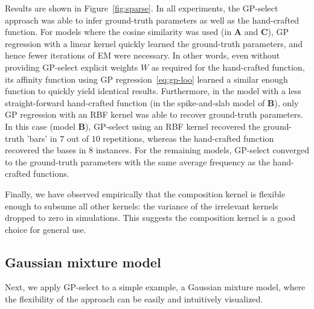 Results are shown in Figure~\ref{fig:sparse}.
In all experiments, the GP-select approach was able to infer ground-truth parameters as well as the hand-crafted function.
For models where the cosine similarity was used (in \textbf{A} and \textbf{C}), GP regression with a linear kernel quickly learned the ground-truth parameters, and hence fewer iterations of EM were necessary.
In other words, even without providing GP-select explicit weights $W$ as required for the hand-crafted function, its affinity function using GP regression~\eqref{eq:gp-loo} learned a similar enough function to quickly yield identical results.
Furthermore, in the model with a less straight-forward hand-crafted function (in the spike-and-slab model of \textbf{B}), only GP regression with an RBF kernel was able to recover ground-truth parameters.
In this case (model \textbf{B}), GP-select using an RBF kernel recovered the ground-truth 'bars' in $7$ out of $10$ repetitions, whereas the hand-crafted function recovered the bases in $8$ instances.
For the remaining models, GP-select converged to the ground-truth parameters with the same average frequency as the hand-crafted functions.


Finally, we have observed empirically that the composition kernel is flexible enough to subsume all other kernels:
the variance of the irrelevant kernels dropped to zero in simulations.
This suggests the composition kernel is a good choice  for general use. 


\subsection{Gaussian mixture model}
%
Next, we apply GP-select to a simple example, a Gaussian mixture model, where the flexibility of the approach can be easily and intuitively visualized.  

